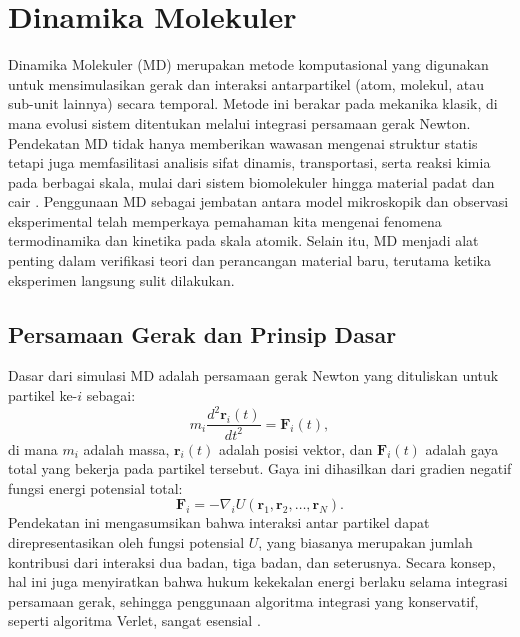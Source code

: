\section{Dinamika Molekuler}
Dinamika Molekuler (MD) merupakan metode komputasional yang digunakan untuk mensimulasikan gerak dan interaksi antarpartikel (atom, molekul, atau sub-unit lainnya) secara temporal.
Metode ini berakar pada mekanika klasik, di mana evolusi sistem ditentukan melalui integrasi persamaan gerak Newton.
Pendekatan MD tidak hanya memberikan wawasan mengenai struktur statis tetapi juga memfasilitasi analisis sifat dinamis, transportasi, serta reaksi kimia pada berbagai skala, mulai dari sistem biomolekuler hingga material padat dan cair \citep{Allen1989,Frenkel2001}.
Penggunaan MD sebagai jembatan antara model mikroskopik dan observasi eksperimental telah memperkaya pemahaman kita mengenai fenomena termodinamika dan kinetika pada skala atomik.
Selain itu, MD menjadi alat penting dalam verifikasi teori dan perancangan material baru, terutama ketika eksperimen langsung sulit dilakukan.

\subsection{Persamaan Gerak dan Prinsip Dasar}
Dasar dari simulasi MD adalah persamaan gerak Newton yang dituliskan untuk partikel ke-\(i\) sebagai:
\begin{equation}
    m_i \frac{d^2 \mathbf{r}_i(t)}{dt^2} = \mathbf{F}_i(t),
\end{equation}
di mana \(m_i\) adalah massa, \(\mathbf{r}_i(t)\) adalah posisi vektor, dan \(\mathbf{F}_i(t)\) adalah gaya total yang bekerja pada partikel tersebut.
Gaya ini dihasilkan dari gradien negatif fungsi energi potensial total:
\begin{equation}
    \mathbf{F}_i = -\nabla_i U(\mathbf{r}_1, \mathbf{r}_2, \ldots, \mathbf{r}_N).
\end{equation}
Pendekatan ini mengasumsikan bahwa interaksi antar partikel dapat direpresentasikan oleh fungsi potensial \( U \), yang biasanya merupakan jumlah kontribusi dari interaksi dua badan, tiga badan, dan seterusnya.
Secara konsep, hal ini juga menyiratkan bahwa hukum kekekalan energi berlaku selama integrasi persamaan gerak, sehingga penggunaan algoritma integrasi yang konservatif, seperti algoritma Verlet, sangat esensial \citep{Allen1989}.

